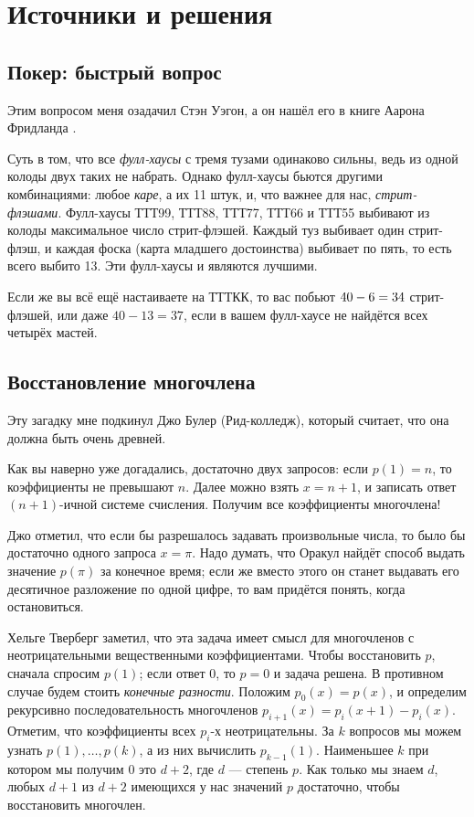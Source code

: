 \section*{Источники и решения}

\subsection*{Покер: быстрый вопрос}

Этим вопросом меня озадачил Стэн Уэгон, а он нашёл его в книге Аарона Фридланда \cite{friedland}.

Суть в том, что все \emph{фулл-хаусы} с тремя тузами одинаково сильны, ведь из одной колоды двух таких не набрать.
Однако фулл-хаусы бьются другими комбинациями: любое \emph{каре}, а их 11 штук, и, что важнее для нас, \emph{стрит-флэшами}.
Фулл-хаусы ТТТ99, ТТТ88, ТТТ77, ТТТ66 и ТТТ55 выбивают из колоды максимальное число стрит-флэшей.
Каждый туз выбивает один стрит-флэш, и каждая фоска (карта младшего достоинства) выбивает по пять, то есть всего выбито 13.
Эти фулл-хаусы и являются лучшими.

Если же вы всё ещё настаиваете на ТТТКК, то вас побьют $40 - 6 \z= 34$ стрит-флэшей, или даже $40 - 13 = 37$, если в вашем фулл-хаусе не найдётся всех четырёх мастей.

\subsection*{Восстановление многочлена}

Эту загадку мне подкинул Джо Булер (Рид-колледж), который считает, что она должна быть очень древней.

Как вы наверно уже догадались, достаточно двух запросов:
если $p(1)=n$, то коэффициенты не превышают $n$.
Далее можно взять $x = n + 1$, и записать ответ $(n + 1)$-ичной системе счисления.
Получим все коэффициенты многочлена!

Джо отметил, что если бы разрешалось задавать произвольные числа, то было бы достаточно одного запроса $x = \pi$.
Надо думать, что Оракул найдёт способ выдать значение $p(\pi)$ за конечное время;
если же вместо этого он станет выдавать его десятичное разложение по одной цифре,
то вам придётся понять, когда остановиться.

Хельге Тверберг заметил, что эта задача имеет смысл для многочленов с неотрицательными вещественными коэффициентами.
Чтобы восстановить $p$, сначала спросим $p(1)$; если ответ $0$, то $p = 0$ и задача решена.
В противном случае будем стоить \emph{конечные разности}.
Положим $p_0(x) = p(x)$, и определим рекурсивно последовательность многочленов $p_{i+1}(x) = p_i (x+1) - p_i(x)$.
Отметим, что коэффициенты всех $p_i$-х неотрицательны.
За $k$ вопросов мы можем узнать $p(1),\dots,p(k)$,
а из них вычислить $p_{k-1}(1)$.
Наименьшее $k$ при котором мы получим $0$ это $d+2$, где $d$ --- степень $p$.
Как только мы знаем $d$, любых $d+1$ из $d+2$ имеющихся у нас значений $p$ достаточно, чтобы восстановить многочлен.

